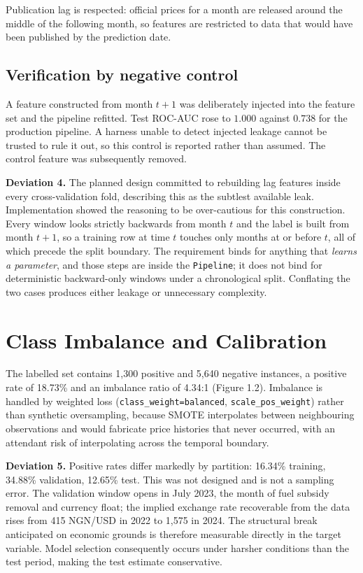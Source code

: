 \documentclass[conference]{IEEEtran}
\begin{document}
Publication lag is respected: official prices for a month are released around
the middle of the following month, so features are restricted to data that
would have been published by the prediction date.

\subsection{Verification by negative control}

A feature constructed from month $t+1$ was deliberately injected into the
feature set and the pipeline refitted. Test ROC-AUC rose to $1.000$ against
$0.738$ for the production pipeline. A harness unable to detect injected
leakage cannot be trusted to rule it out, so this control is reported rather
than assumed. The control feature was subsequently removed.

\textbf{Deviation 4.} The planned design committed to rebuilding lag features
inside every cross-validation fold, describing this as the subtlest available
leak. Implementation showed the reasoning to be over-cautious for this
construction. Every window looks strictly backwards from month $t$ and the
label is built from month $t+1$, so a training row at time $t$ touches only
months at or before $t$, all of which precede the split boundary. The
requirement binds for anything that \emph{learns a parameter}, and those steps
are inside the \texttt{Pipeline}; it does not bind for deterministic
backward-only windows under a chronological split. Conflating the two cases
produces either leakage or unnecessary complexity.

\section{Class Imbalance and Calibration}
\label{sec:results}

The labelled set contains 1{,}300 positive and 5{,}640 negative instances, a
positive rate of 18.73\% and an imbalance ratio of 4.34:1 (Figure 1.2).
Imbalance is handled by weighted loss (\texttt{class\_weight=balanced},
\texttt{scale\_pos\_weight}) rather than synthetic oversampling, because SMOTE
interpolates between neighbouring observations and would fabricate price
histories that never occurred, with an attendant risk of interpolating across
the temporal boundary.

\textbf{Deviation 5.} Positive rates differ markedly by partition: 16.34\%
training, 34.88\% validation, 12.65\% test. This was not designed and is not a
sampling error. The validation window opens in July 2023, the month of fuel
subsidy removal and currency float; the implied exchange rate recoverable from
the data rises from 415 NGN/USD in 2022 to 1{,}575 in 2024. The structural
break anticipated on economic grounds is therefore measurable directly in the
target variable. Model selection consequently occurs under harsher conditions
than the test period, making the test estimate conservative.
\end{document}
